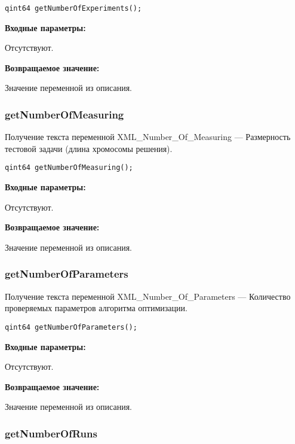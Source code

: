 \documentclass[a4paper,12pt]{article}
\begin{document}
\begin{lstlisting}[label=code_syntax_getNumberOfExperiments,caption=Синтаксис]
qint64 getNumberOfExperiments();
\end{lstlisting}

\textbf{Входные параметры:}

Отсутствуют.

\textbf{Возвращаемое значение:}

Значение переменной из описания.


\subsubsection{getNumberOfMeasuring}\label{getNumberOfMeasuring}

Получение текста переменной  XML\_Number\_Of\_Measuring --- Размерность тестовой задачи (длина хромосомы решения).


\begin{lstlisting}[label=code_syntax_getNumberOfMeasuring,caption=Синтаксис]
qint64 getNumberOfMeasuring();
\end{lstlisting}

\textbf{Входные параметры:}

Отсутствуют.

\textbf{Возвращаемое значение:}

Значение переменной из описания.


\subsubsection{getNumberOfParameters}\label{getNumberOfParameters}

Получение текста переменной  XML\_Number\_Of\_Parameters --- Количество проверяемых параметров алгоритма оптимизации.


\begin{lstlisting}[label=code_syntax_getNumberOfParameters,caption=Синтаксис]
qint64 getNumberOfParameters();
\end{lstlisting}

\textbf{Входные параметры:}

Отсутствуют.

\textbf{Возвращаемое значение:}

Значение переменной из описания.


\subsubsection{getNumberOfRuns}\label{getNumberOfRuns}
\end{document}
